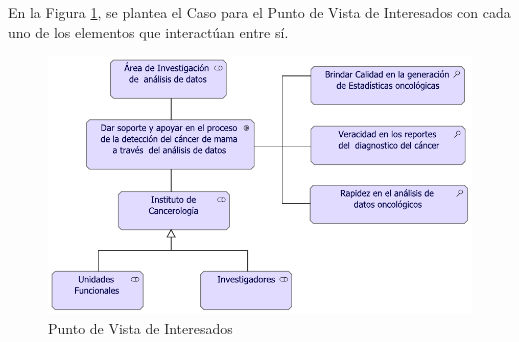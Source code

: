 En la Figura \ref{PvInteresados}, se plantea el Caso para el Punto de Vista de Interesados con cada uno de los elementos que interactúan entre sí. 

\begin{figure}[h!]
	\centering
	\includegraphics[width=1\linewidth]{ARQUITECTURA/imgs/CapaMotivacion/1_PvInteresados}
	\caption{Punto de Vista de Interesados}
	\label{PvInteresados}
\end{figure}

